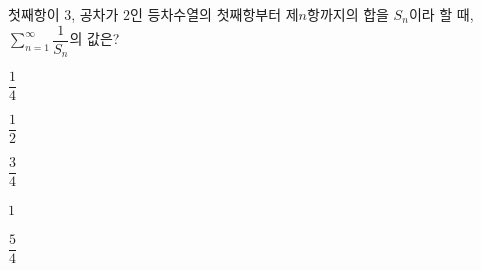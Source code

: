 첫째항이 $3$, 공차가 $2$인 등차수열의 첫째항부터 제$n$항까지의 합을 $S_n$이라 할 때, $\displaystyle\sum_{n=1}^{\infty}\dfrac{1}{S_n}$의 값은?
\begin{choices32}{\rule[-3ex]{0pt}{8ex}$\dfrac{1}{4}$}{\rule[-3ex]{0pt}{8ex}$\dfrac{1}{2}$}{\rule[-3ex]{0pt}{8ex}$\dfrac{3}{4}$}{\rule[-3ex]{0pt}{8ex}$1$}{\rule[-3ex]{0pt}{8ex}$\dfrac{5}{4}$}\end{choices32}
